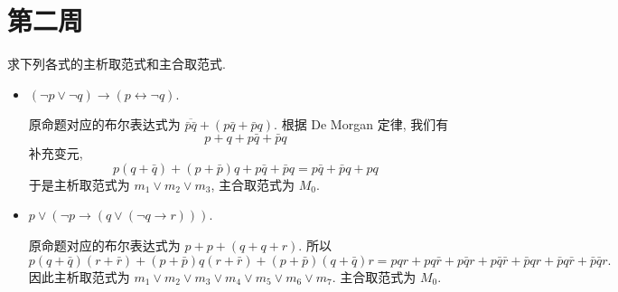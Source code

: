 \documentclass[10pt,UTF8]{ctexbook} %
\begin{document}
\section{第二周}

\begin{example}
    求下列各式的主析取范式和主合取范式.
    \begin{itemize}[itemsep=0pt]
        \item $(\lnot p \vee \lnot q) \to (p \leftrightarrow \lnot q)$.
        \begin{sol}
            原命题对应的布尔表达式为 $\overline{\bar p \bar q} + \left(
                p\bar q + \bar p q
            \right)$. 根据 De Morgan 定律, 我们有
            \[ p+q + p \bar q + \bar p q \]
            补充变元,
            \[ p(q +\bar q) + (p + \bar p)q + p \bar q + \bar p q = p\bar q + \bar pq + pq \]
            于是主析取范式为 $m_1 \vee m_2 \vee m_3$, 主合取范式为 $M_0$.
        \end{sol}
        \item $p \vee (\lnot p \to (q \vee (\lnot q \to r)))$.
        \begin{sol}
            原命题对应的布尔表达式为 $p+p+(q + q + r)$. 所以
            \[ p(q + \bar q)(r + \bar r) + (p + \bar p)q(r+ \bar r) + (p +\bar p)(q + \bar q)r =
            pqr + pq \bar r + p \bar q r + p \bar q \bar r + \bar p qr + \bar p q \bar r + \bar p \bar q r. \]
            因此主析取范式为 $m_1 \vee m_2 \vee m_3 \vee m_4 \vee m_5 \vee m_6 \vee m_7$.
            主合取范式为 $M_0$.
        \end{sol}
    \end{itemize}
\end{example}
\end{document}
